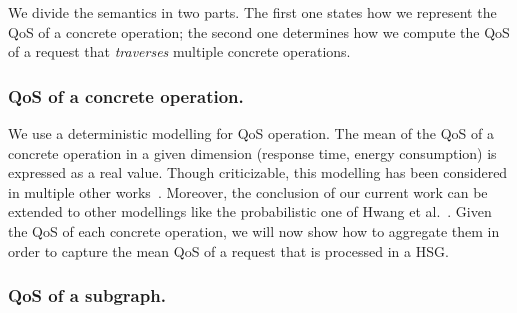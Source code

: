 \documentclass[a4paper]{article}
\begin{document}
We divide the semantics in two parts. The first one states how we represent the QoS of a concrete 
operation; the second one determines how we compute the QoS of a request that {\it traverses} multiple 
concrete operations.

\subsubsection{QoS of a concrete operation.}

We use a deterministic modelling for QoS operation. The mean of the QoS of a concrete 
operation in a given dimension (response time, energy consumption) is expressed as a real value. 
Though criticizable, this modelling has been considered in multiple other works~\cite{Cardoso2004281,ZengMiddleware,GoldmanNgoko}. 
Moreover, the conclusion of our current work can be extended to other modellings like the  
probabilistic one  of Hwang et al.~\cite{Hwang20075484}. Given the QoS of each concrete operation, we will now show how to 
aggregate them in order to capture the mean QoS of a request that is processed in a HSG. 


\subsubsection{QoS of a subgraph.}
\end{document}
